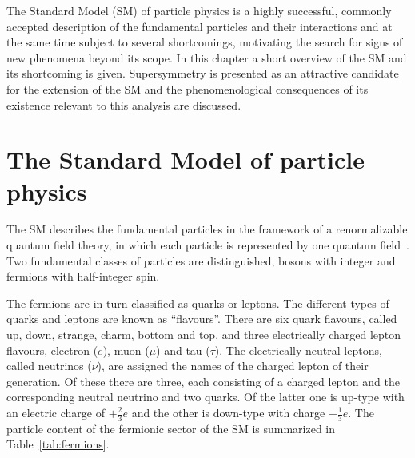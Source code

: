 The Standard Model (SM) of particle physics is a highly successful, commonly accepted description of the fundamental particles and their interactions and at the same time subject to several shortcomings, motivating the search for signs of new phenomena beyond its scope. In this chapter a short overview of the SM and its shortcoming is given. Supersymmetry is presented as an attractive candidate for the extension of the SM and the phenomenological consequences of its existence relevant to this analysis are discussed. 
\section{The Standard Model of particle physics}
The SM describes the fundamental particles in the framework of a renormalizable quantum field theory, in which each particle is represented by one quantum field~\cite{Glashow1961579,Salam1964168,PhysRevLett.19.1264,PhysRevD.5.1412}. Two fundamental classes of particles are distinguished, bosons with integer and fermions with half-integer spin. 

The fermions are in turn classified as quarks or leptons. The different types of quarks and leptons are known as ``flavours''. There are six quark flavours, called up, down, strange, charm, bottom and top, and three electrically charged lepton flavours, electron ($e$), muon ($\mu$) and tau ($\tau$). The electrically neutral leptons, called neutrinos ($\nu$), are assigned the names of the charged lepton of their generation. Of these there are three, each consisting of a charged lepton and the corresponding neutral neutrino and two quarks. Of the latter one is up-type with an electric charge of $+\frac{2}{3}e$ and the other is down-type with charge $-\frac{1}{3}e$. The particle content of the fermionic sector of the SM is summarized in Table~\ref{tab:fermions}.

